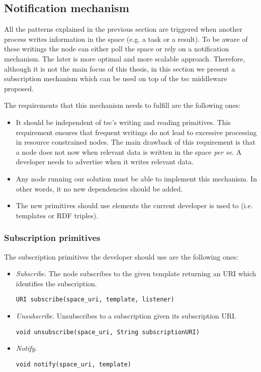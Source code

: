 



\subsection{Notification mechanism}
\label{sec:notification}

All the patterns explained in the previous section are triggered when another process writes information in the space (e.g. a task or a result).
To be aware of these writings the node can either poll the space or rely on a notification mechanism.
The later is more optimal and more scalable approach.
Therefore, although it is not the main focus of this thesis, in this section we present a subscription mechanism which can be used on top of the \ac{tsc} middleware proposed.

The requirements that this mechanism needs to fulfill are the following ones:
\begin{itemize}
  \item It should be independent of \ac{tsc}'s writing and reading primitives.
	This requirement ensures that frequent writings do not lead to excessive processing in resource constrained nodes.
	The main drawback of this requirement is that a node does not now when relevant data is written in the space \emph{per se}.
	A developer needs to advertise when it writes relevant data.
  \item Any node running our solution must be able to implement this mechanism.
	In other words, it no new dependencies should be added.
  \item The new primitives should use elements the current developer is used to (i.e. templates or RDF triples).
\end{itemize}


\subsubsection{Subscription primitives}

The subscription primitives the developer should use are the following ones:
\begin{itemize}
  \item \emph{Subscribe}. The node subscribes to the given template returning an URI which identifies the subscription.
    \begin{verbatim}
URI subscribe(space_uri, template, listener)
    \end{verbatim}
  \item \emph{Unsubscribe}. Unsubscribes to a subscription given its subscription URI.
    \begin{verbatim}
void unsubscribe(space_uri, String subscriptionURI)
    \end{verbatim}
  \item \emph{Notify}.
    \begin{verbatim}
void notify(space_uri, template)
    \end{verbatim}
\end{itemize}


